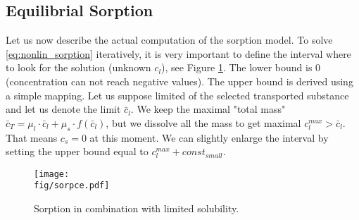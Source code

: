 \subsection{Equilibrial Sorption}
\label{sec:num_sorp_math}

Let us now describe the actual computation of the sorption model.
To solve \eqref{eq:nonlin_sorption} iteratively, it is very important to define the interval where 
to look for the solution (unknown $c_l$), see Figure \ref{fig:sorpce}. The lower bound is $0$ (concentration can not reach negative values). 
The upper bound is derived using a simple mapping. Let us suppose limited 
 of the selected transported substance and let us denote the 
limit $\bar{c}_l$. We keep the maximal "total mass" 
$\bar{c}_T= \mu_l\cdot \bar{c}_l + \mu_s\cdot f(\bar{c}_l)$, but we dissolve all the mass to get 
maximal $c_l^{max} > \bar{c}_l$. That means $c_s = 0$ at this moment. We can slightly enlarge the interval by setting the upper bound equal to 
$c_l^{max} + const_{small}$.

\begin{figure}[ht!]
 \centering
 \texttt{[image: \\fig/sorpce.pdf]}
 \caption{Sorption in combination with limited solubility.}
 \label{fig:sorpce}
\end{figure}


